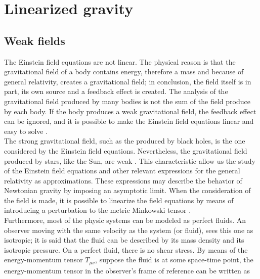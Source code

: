 \chapter{Linearized gravity } \label{ch: firstchapter} %

\section{Weak fields}
The Einstein field equations are not linear. The physical reason is that the gravitational field of a body contains energy, therefore a mass and because of general relativity, creates a gravitational field; in conclusion, the field itself is in part, its own source and a feedback effect is created. The analysis of the gravitational field produced by many bodies is not the sum of the field produce by each body. If the body produces a weak gravitational field, the feedback effect can be ignored, and it is possible to make the Einstein field equations linear and easy to solve \cite{Adler}.\\

The strong gravitational field, such as the produced by black holes, is the one considered by the Einstein field equations. Nevertheless, the gravitational field produced by stars, like the Sun, are weak \cite{GravityPoisson}. This characteristic allow us the study of the Einstein field equations and other relevant expressions for the general relativity as approximations. These expressions may describe the behavior of Newtonian gravity by imposing an asymptotic limit. When the consideration of the field is made, it is possible to linearize the field equations by means of introducing a perturbation to the metric Minkowski tensor \cite{Larranaga}. \\

Furthermore, most of the physic systems can be modeled as perfect fluids. An observer moving with the same velocity as the system (or fluid), sees this one as isotropic; it is said that the fluid can be described by its mass density and its isotropic pressure. On a perfect fluid, there is no shear stress. By means of the energy-momentum tensor $T_{\mu\nu}$, suppose the fluid is at some space-time point, the energy-momentum tensor in the observer's frame of reference can be written as

